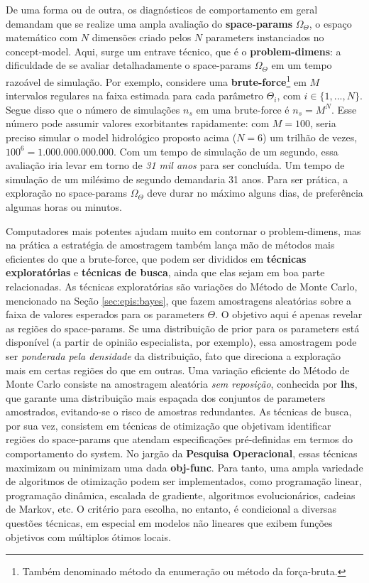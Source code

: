 \documentclass[./main.tex]{subfiles}
\begin{document}
\par De uma forma ou de outra, os diagnósticos de comportamento em geral demandam que se realize uma ampla avaliação do \textbf{\gls{space-params}} $\Omega_{\Theta}$, o espaço matemático com $N$ dimensões criado pelos $N$ \gls{parameters} instanciados no \gls{concept-model}. Aqui, surge um entrave técnico, que é o \textbf{\gls{problem-dimens}}: a dificuldade de se avaliar detalhadamente o \gls{space-params} $\Omega_{\Theta}$ em um tempo razoável de simulação. Por exemplo, considere uma \textbf{\gls{brute-force}}\footnote{Também denominado método da enumeração ou método da força-bruta.} em $M$ intervalos regulares na faixa estimada para cada parâmetro $\Theta_i$, com $i \in \{1, ..., N\}$. Segue disso que o número de simulações $n_s$ em uma \gls{brute-force} é $n_s = M^N$. Esse número pode assumir valores exorbitantes rapidamente: com $M=100$, seria preciso simular o \gls{model} hidrológico proposto acima ($N=6$) um trilhão de vezes, $100^6 = 1.000.000.000.000$. Com um tempo de simulação de um segundo, essa avaliação iria levar em torno de \textit{31 mil anos} para ser concluída. Um tempo de simulação de um milésimo de segundo demandaria 31 anos. Para ser prática, a exploração no \gls{space-params} $\Omega_{\Theta}$ deve durar no máximo alguns dias, de preferência algumas horas ou minutos. 

\par Computadores mais potentes ajudam muito em contornar o \gls{problem-dimens}, mas na prática a estratégia de amostragem também lança mão de métodos mais eficientes do que a \gls{brute-force}, que podem ser divididos em \textbf{técnicas exploratórias} e \textbf{técnicas de busca}, ainda que elas sejam em boa parte relacionadas. As técnicas exploratórias são variações do Método de Monte Carlo, mencionado na Seção \ref{sec:epis:bayes}, que fazem amostragens aleatórias sobre a faixa de valores esperados para os \gls{parameters} $\Theta$. O objetivo aqui é apenas revelar as regiões do \gls{space-params}. Se uma distribuição de \gls{prior} para os \gls{parameters} está disponível (a partir de opinião especialista, por exemplo), essa amostragem pode ser \textit{ponderada pela densidade} da distribuição, fato que direciona a exploração mais em certas regiões do que em outras. Uma variação eficiente do Método de Monte Carlo consiste na amostragem aleatória \textit{sem reposição}, conhecida por \textbf{\gls{lhs}}, que garante uma distribuição mais espaçada dos conjuntos de \gls{parameters} amostrados, evitando-se o risco de amostras redundantes. As técnicas de busca, por sua vez, consistem em técnicas de otimização que objetivam identificar regiões do \gls{space-params} que atendam especificações pré-definidas em termos do comportamento do \gls{system}. No jargão da \textbf{Pesquisa Operacional}, essas técnicas maximizam ou minimizam uma dada \textbf{\gls{obj-func}}. Para tanto, uma ampla variedade de algoritmos de otimização podem ser implementados, como programação linear, programação dinâmica, escalada de gradiente, algoritmos evolucionários, cadeias de Markov, etc. O critério para escolha, no entanto, é condicional a diversas questões técnicas, em especial em modelos não lineares que exibem funções objetivos com múltiplos ótimos locais.
\end{document}
